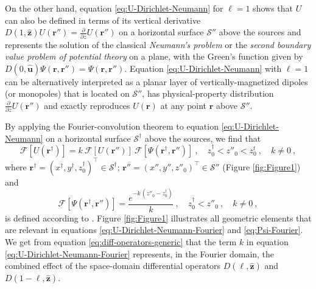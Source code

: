 \documentclass[manuscript,noblind]{geophysics}
\begin{document}
	On the other hand, equation \ref{eq:U-Dirichlet-Neumann} for $\ell = 1$ shows that $U$ can also
	be defined in terms of its vertical derivative 
	$D(1, \hat{\mathbf{z}}) U(\mathbf{r}'') = \tfrac{\partial}{\partial z} U(\mathbf{r}'')$ 
	on a horizontal surface $\mathcal{S}''$ above the sources and represents the solution of the classical \textit{Neumann’s problem} or the 
	\textit{second boundary value problem of potential theory} \cite[][ p. 246]{kellogg1967} on a plane, 
	with the Green's function given by $D(0, \hat{\mathbf{u}}) \Psi(\mathbf{r}, \mathbf{r}'') = \Psi(\mathbf{r}, \mathbf{r}'')$.
	Equation \ref{eq:U-Dirichlet-Neumann} with $\ell = 1$ can be alternatively interpreted as a planar layer of
	vertically-magnetized dipoles (or monopoles) that is located on $\mathcal{S}''$, has 
	physical-property distribution $\tfrac{\partial}{\partial z} U(\mathbf{r}'')$ and exactly reproduces 
	$U(\mathbf{r})$ at any point $\mathbf{r}$ above $\mathcal{S}''$.
	
	By applying the Fourier-convolution theorem \cite[][ p. 268]{blakely1996} to equation \ref{eq:U-Dirichlet-Neumann} 
	on a horizontal surface $\mathcal{S}^{\dagger}$ above the sources, we find that
	\begin{equation}
		\mathcal{F} [ U(\mathbf{r}^{\dagger}) ] = 
		k \: \mathcal{F} [ U(\mathbf{r}'') ] \:
		\mathcal{F} [ \Psi(\mathbf{r}^{\dagger}, \mathbf{r}'') ] \: ,
		\quad z^{\dagger}_{0} < z''_{0} < z^{t}_{0} \: , \quad k \ne 0 \: ,
		\label{eq:U-Dirichlet-Neumann-Fourier}
	\end{equation}
	where $\mathbf{r}^{\dagger} = (x^{\dagger}, y^{\dagger}, z^{\dagger}_{0})^{\top} \in \mathcal{S}^{\dagger}$; 
	$\mathbf{r}'' = (x'', y'', z''_{0})^{\top} \in \mathcal{S}''$ (Figure \ref{fig:Figure1}) and
	\begin{equation}
		\mathcal{F} [ \Psi(\mathbf{r}^{\dagger}, \mathbf{r}'') ] 
		= \frac{e^{- k \, (z''_{0} - z^{\dagger}_{0})}}{k}
		\: , \quad z^{\dagger}_{0} < z''_{0} \: , \quad k \ne 0 \: ,
		\label{eq:Psi-Fourier}
	\end{equation}
	is defined according to \citet[][ p. 275]{blakely1996}.
	Figure \ref{fig:Figure1} illustrates all geometric elements that are relevant in equations  
	\ref{eq:U-Dirichlet-Neumann-Fourier} and \ref{eq:Psi-Fourier}.
	We get from equation \ref{eq:diff-operators-generic} that the term $k$ in equation \ref{eq:U-Dirichlet-Neumann-Fourier} represents,
	in the Fourier domain, the combined effect of the space-domain differential operators $D(\ell, \hat{\mathbf{z}})$ and 
	$D(1-\ell, \hat{\mathbf{z}})$.
	
\end{document}

